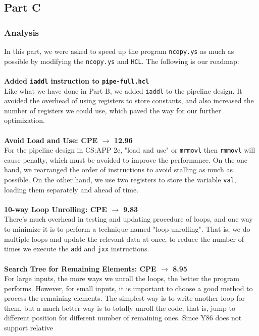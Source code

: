 \documentclass[12pt,a4paper]{article}
\begin{document}
\subsection{Part C}
\subsubsection{Analysis}
In this part, we were asked to speed up the program \texttt{ncopy.ys} as much as possible by modifying the \texttt{ncopy.ys} and \texttt{HCL}.
The following is our roadmap:\\
\\
\textbf{Added \texttt{iaddl} instruction to \texttt{pipe-full.hcl} }\\
Like what we have done in Part B, we added \texttt{iaddl} to the pipeline design. It avoided the overhead of using registers to store constants, and also increased the number of registers we could use, which paved the way for our further optimization.\\
\\
\textbf{Avoid Load and Use: CPE $\rightarrow$ 12.96} \\
For the pipeline design in CS:APP 2e, "load and use" or \texttt{mrmovl} then \texttt{rmmovl} will cause penalty,
which must be avoided to improve the performance. On the one hand, we rearranged the order of 
instructions to avoid stalling as much as possible. On the other hand, we use two registers to store 
the variable \texttt{val}, loading them separately and ahead of time.\\
\\
\textbf{10-way Loop Unrolling:  CPE $\rightarrow$ 9.83} \\
There's much overhead in testing and updating procedure of loops, and one way to minimize it is to 
perform a technique named "loop unrolling". That is, we do multiple loops and update the relevant 
data at once, to reduce the number of times we execute the \texttt{add} and \texttt{jxx} instructions. \\
\\
\textbf{Search Tree for Remaining Elements:  CPE $\rightarrow$ 8.95} \\
For large inputs, the more ways we unroll the loops, the better the program performs. However, for 
small inputs, it is important to choose a good method to process the remaining elements. The simplest 
way is to write another loop for them, but a much better way is to totally unroll the code, that is, 
jump to different position for different number of remaining ones. Since Y86 does not support relative 
\end{document}
